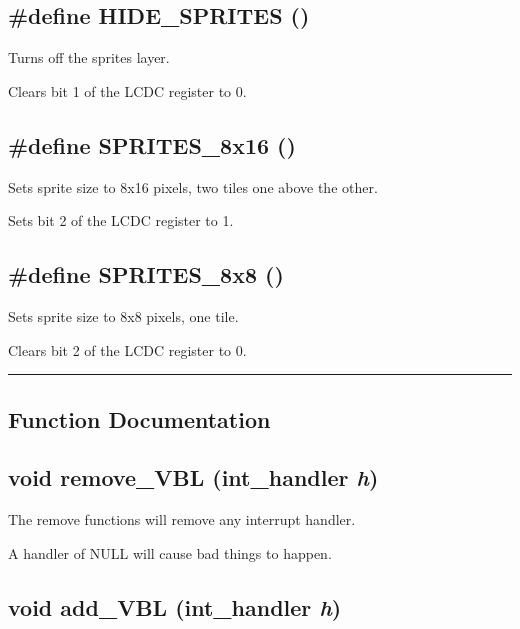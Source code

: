 \subsection{\setlength{\rightskip}{0pt plus 5cm}\#define HIDE\_\-SPRITES ()}

Turns off the sprites layer.

Clears bit 1 of the LCDC register to 0. \label{gb.h_a51}
\subsection{\setlength{\rightskip}{0pt plus 5cm}\#define SPRITES\_\-8x16 ()}

Sets sprite size to 8x16 pixels, two tiles one above the other.

Sets bit 2 of the LCDC register to 1. \label{gb.h_a52}
\subsection{\setlength{\rightskip}{0pt plus 5cm}\#define SPRITES\_\-8x8 ()}

Sets sprite size to 8x8 pixels, one tile.

Clears bit 2 of the LCDC register to 0. \vspace{0.4cm}\hrule\vspace{0.2cm}
\subsection*{Function Documentation}
\label{gb.h_a53}
\subsection{\setlength{\rightskip}{0pt plus 5cm}void remove\_\-VBL ({\bf int\_\-handler} {\em h})}

The remove functions will remove any interrupt handler.

A handler of NULL will cause bad things to happen. \label{gb.h_a58}
\subsection{\setlength{\rightskip}{0pt plus 5cm}void add\_\-VBL ({\bf int\_\-handler} {\em h})}

